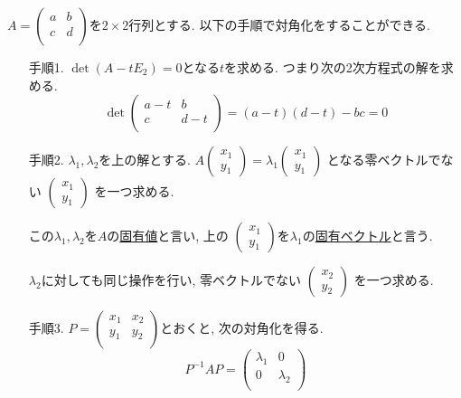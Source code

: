 \documentclass[dvipdfmx,a4paper,11pt]{article}
\theoremstyle{definition}
\begin{document}
  \begin{tcolorbox}[
    colback = white,
    colframe = green!35!black,
    fonttitle = \bfseries,
    breakable = true]    
$A=\begin{pmatrix}
a& b \\
c& d \\
\end{pmatrix}$を$2 \times 2$行列とする. 以下の手順で対角化をすることができる. 
\begin{enumerate}
	\setlength{\parskip}{0cm}
  	\setlength{\itemsep}{0pt} 
\item[手順1.] $\det (A - tE_2) =0$となる$t$を求める. つまり次の2次方程式の解を求める.
$$
\det
\begin{pmatrix}
a-t& b \\
c& d -t\\
\end{pmatrix}
= (a-t)(d-t) -bc=0
$$
\item[手順2.] $\lambda_1, \lambda_2$を上の解とする. 
$
A\begin{pmatrix}
x_1 \\ y_1
 \end{pmatrix}  
 = 
 \lambda_1
 \begin{pmatrix}
x_1 \\ y_1
 \end{pmatrix}  
$
となる零ベクトルでない
$ \begin{pmatrix}
x_1 \\ y_1
 \end{pmatrix}  
 $
 を一つ求める. 
 
 この$\lambda_1, \lambda_2$を$A$の\underline{固有値}と言い, 上の
 $ \begin{pmatrix}
x_1 \\ y_1
 \end{pmatrix}  
 $を$\lambda_1$の\underline{固有ベクトル}と言う.
 
 $\lambda_2$に対しても同じ操作を行い, 零ベクトルでない
$ \begin{pmatrix}
x_2 \\ y_2
 \end{pmatrix}  
 $
 を一つ求める. 
 
\item[手順3.]  
$P=\begin{pmatrix}
x_1& x_2 \\
y_1& y_2 \\
\end{pmatrix}$とおくと, 次の対角化を得る.
$$
P^{-1} A P=
\begin{pmatrix}
\lambda_1& 0 \\
0& \lambda_2\\
\end{pmatrix}
$$ 
\end{enumerate}
 \end{tcolorbox}
 
\end{document}
